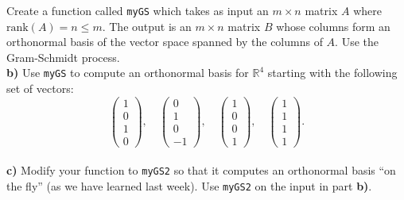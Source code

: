 \documentclass[11pt]{amsart}
\theoremstyle{definition}  %
\begin{document}
  Create a function called {\tt myGS} which takes as input an $m \times n$ matrix $A$ where $\mathrm{rank}(A) = n \leq m$.  The output is an $m \times n$
matrix $B$ whose columns form an orthonormal basis of the vector space spanned by the columns of $A$. Use the Gram-Schmidt process. \\
{\bf b)} Use {\tt myGS} to compute an orthonormal basis for $\mathbb{R}^4$ starting with the following set of vectors:
$$ \left( \begin{array}{r} 1 \\ 0   \\  1 \\ 0\end{array} \right), \quad
\left( \begin{array}{r} 0\\ 1 \\ 0 \\  -1 \end{array} \right), \quad
\left( \begin{array}{r}  1 \\ 0 \\ 0 \\ 1 \end{array} \right), \quad \left( \begin{array}{r} 1\\ 1 \\ 1 \\  1\end{array} \right).$$\\
{\bf c)}  Modify your function to {\tt myGS2} so that it computes an orthonormal basis ``on the fly'' (as we have learned last week). Use {\tt myGS2} on the input in part {\bf b)}. \\




 
\end{document}
